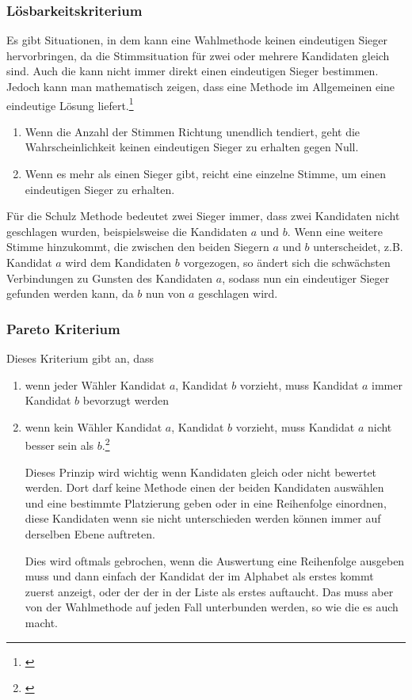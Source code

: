 \subsubsection{Lösbarkeitskriterium} 
\label{sec:loesbarkeitsKriterium}
Es gibt Situationen, in dem kann eine Wahlmethode keinen eindeutigen Sieger hervorbringen, da die Stimmsituation für zwei oder mehrere Kandidaten gleich sind. Auch die \schulze kann nicht immer direkt einen eindeutigen Sieger bestimmen. Jedoch kann man mathematisch zeigen, dass eine Methode im Allgemeinen eine eindeutige Lösung liefert.\footnote{\Vgl \citet{Schulze2017}}
\begin{enumerate}
\item Wenn die Anzahl der Stimmen Richtung unendlich tendiert, geht die Wahrscheinlichkeit keinen eindeutigen Sieger zu erhalten gegen Null.
\item Wenn es mehr als einen Sieger gibt, reicht eine einzelne Stimme, um einen eindeutigen Sieger zu erhalten.
\end{enumerate}

Für die Schulz Methode bedeutet zwei Sieger immer, dass zwei Kandidaten nicht geschlagen wurden, beispielsweise die Kandidaten $a$ und $b$. Wenn eine weitere Stimme hinzukommt, die zwischen den beiden Siegern $a$ und $b$ unterscheidet, z.B. Kandidat $a$ wird dem Kandidaten $b$ vorgezogen, so ändert sich die schwächsten Verbindungen zu Gunsten des Kandidaten $a$, sodass nun ein eindeutiger Sieger gefunden werden kann, da $b$ nun von $a$ geschlagen wird.


\subsubsection{Pareto Kriterium} 
\label{sec:paretoKriterium}
Dieses Kriterium gibt an, dass
\begin{enumerate}
\item wenn jeder Wähler Kandidat $a$, Kandidat $b$ vorzieht, muss Kandidat $a$ immer Kandidat $b$ bevorzugt werden
\item wenn kein Wähler Kandidat $a$, Kandidat $b$ vorzieht, muss Kandidat $a$ nicht besser sein als $b$.\footnote{\Vgl \citet{Schulze2017}}

Dieses Prinzip wird wichtig wenn Kandidaten gleich oder nicht bewertet werden. Dort darf keine Methode einen der beiden Kandidaten auswählen und eine bestimmte Platzierung geben oder in eine Reihenfolge einordnen, diese Kandidaten wenn sie nicht unterschieden werden können immer auf derselben Ebene auftreten. 

Dies wird oftmals gebrochen, wenn die Auswertung eine Reihenfolge ausgeben muss und dann einfach der Kandidat der im Alphabet als erstes kommt zuerst anzeigt, oder der der in der Liste als erstes auftaucht. Das muss aber von der Wahlmethode auf jeden Fall unterbunden werden, so wie die \schulze es auch macht. 
\end{enumerate}

